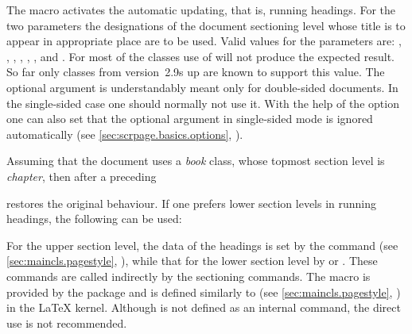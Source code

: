 \begin{Declaration}
\end{Declaration}%
%
The macro  activates the automatic updating, that is, running
headings.  For the two parameters the designations of the document sectioning
level whose title is to appear in appropriate place are to be used.  Valid
values for the parameters are:
, ,
, , ,
, and .  For most of the classes use of
 will not produce the expected result. So far only {\KOMAScript}
classes from version~2.9s up are known to support this value. The optional
argument  is understandably meant only for double-sided
documents. In the single-sided case one should normally not use it.  With the
help of the option
one can also set that the optional argument in single-sided mode is ignored
automatically (see \autoref{sec:scrpage.basics.options},
).
%
\begin{Example}
  Assuming that the document uses a \emph{book} class, whose topmost
  section level is \emph{chapter}, then after a preceding
\begin{lstcode}
\end{lstcode}
  restores the original behaviour.  If one prefers lower section levels
  in running headings, the following can be used:
\begin{lstcode}
\end{lstcode}
\end{Example}

\begin{Explain}
  For the upper section level, the data of the headings is set by the command
   (see \autoref{sec:maincls.pagestyle},
  ), while that for the lower section
  level by  or
  .  These commands are called indirectly
  by the sectioning commands.  The macro  is provided by the
  package  and is defined similarly to 
  (see \autoref{sec:maincls.pagestyle},
  ) in the {\LaTeX} kernel.  Although
   is not defined as an internal command, the direct use is
  not recommended.
\end{Explain}
%
%
%
%
%


